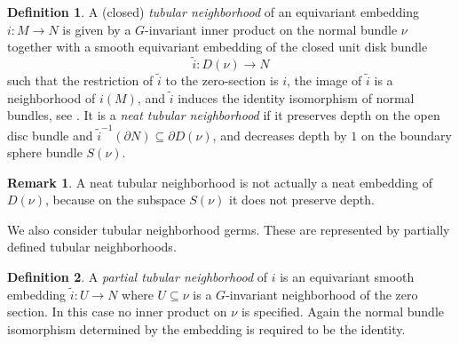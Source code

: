 \documentclass[11pt]{amsart}
\theoremstyle{definition}
\newtheorem{defn}{Definition}[section]
\newtheorem{rem}{Remark}[section]
\numberwithin{equation}{section}
\numberwithin{figure}{section}
\newcommand{\ti}{\widetilde}
\newcommand{\ourdefn}[1]{{\it #1}}
\begin{document}
\begin{defn}\label{neat_tubular_nbhd}
A (closed) \ourdefn{tubular neighborhood} of an equivariant embedding $i\colon M \to N$ is given by a $G$-invariant inner product on the normal bundle $\nu$ together with a smooth equivariant embedding of the closed unit disk bundle
\[ \tilde i:D(\nu)\to N \]
such that the restriction of $\ti i$ to the zero-section is $i$, the image of $\ti i$ is a neighborhood of $i(M)$, and $\ti i$ induces the identity  isomorphism of normal bundles, see \cite[Def 2.23]{GIMM1}. It is a \ourdefn{neat tubular neighborhood} if it preserves depth on the open disc bundle and $\tilde{i}^{-1}(\partial N)\subseteq \partial D(\nu)$, and decreases depth by $1$ on the boundary sphere bundle $S(\nu)$.
\end{defn}

\begin{rem}A neat tubular neighborhood is not actually a neat embedding of $D(\nu)$, because on the subspace $S(\nu)$ it does not preserve depth.\end{rem}




We also consider tubular neighborhood germs. These are represented by partially defined tubular neighborhoods.

\begin{defn}\label{tubular neighborhood germ}
A \ourdefn{partial tubular neighborhood} of $i$ is an equivariant smooth embedding $\tilde i:U\to N$ where $U\subseteq \nu$ is a $G$-invariant neighborhood of the zero section. In this case no inner product on $\nu$ is specified. Again the normal bundle isomorphism determined by the embedding is required to be the identity.
\end{defn} 
\end{document}
